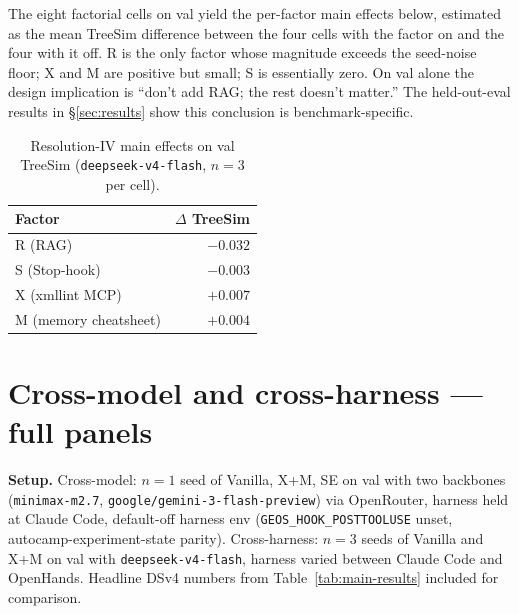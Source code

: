 \documentclass{article}
\begin{document}
The eight factorial cells on val yield the per-factor main effects below, estimated as the mean TreeSim difference between the four cells with the factor on and the four with it off. R is the only factor whose magnitude exceeds the seed-noise floor; X and M are positive but small; S is essentially zero. On val alone the design implication is ``don't add RAG; the rest doesn't matter.'' The held-out-eval results in \S\ref{sec:results} show this conclusion is benchmark-specific.

\begin{table}[h]
  \caption{Resolution-IV main effects on val TreeSim (\texttt{deepseek-v4-flash}, $n=3$ per cell).}
  \label{tab:main-effects}
  \centering
  \small
  \begin{tabular}{lr}
    \toprule
    \textbf{Factor} & \textbf{$\Delta$ TreeSim} \\
    \midrule
    R (RAG)                & $-0.032$ \\
    S (Stop-hook)          & $-0.003$ \\
    X (xmllint MCP)        & $+0.007$ \\
    M (memory cheatsheet)  & $+0.004$ \\
    \bottomrule
  \end{tabular}
\end{table}

\section{Cross-model and cross-harness — full panels}
\label{app:cross-model-detail}
\label{app:cross-model}

\textbf{Setup.} Cross-model: $n=1$ seed of Vanilla, X+M, SE on val with two backbones (\texttt{minimax-m2.7}, \texttt{google/gemini-3-flash-preview}) via OpenRouter, harness held at Claude Code, default-off harness env (\texttt{GEOS\_HOOK\_POSTTOOLUSE} unset, autocamp-experiment-state parity). Cross-harness: $n=3$ seeds of Vanilla and X+M on val with \texttt{deepseek-v4-flash}, harness varied between Claude Code and OpenHands. Headline DSv4 numbers from Table~\ref{tab:main-results} included for comparison.
\end{document}
